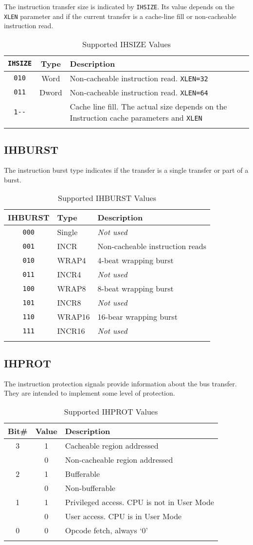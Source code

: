 The instruction transfer size is indicated by \texttt{IHSIZE}. Its value depends
on the \texttt{XLEN} parameter and if the current transfer is a cache-line fill
or non-cacheable instruction read.

\begin{longtable}[]{@{}ccp{7cm}@{}}
\toprule
\texttt{IHSIZE} & Type & Description\tabularnewline
\midrule
\endhead
\texttt{010}   & Word  & Non-cacheable instruction read. \texttt{XLEN=32}\tabularnewline
\texttt{011}   & Dword & Non-cacheable instruction read. \texttt{XLEN=64}\tabularnewline
\texttt{1-\/-} &       & Cache line fill. The actual size depends on the Instruction cache parameters and \texttt{XLEN}\tabularnewline
\bottomrule
\caption{Supported IHSIZE Values}
\label{tab:isize-values}
\end{longtable}

\subsection{IHBURST}\label{ihburst}

The instruction burst type indicates if the transfer is a single
transfer or part of a burst.

\begin{longtable}[]{@{}cll@{}}
\toprule
IHBURST & Type & Description\tabularnewline
\midrule
\endhead
\texttt{000} & Single & \emph{Not used}\tabularnewline
\texttt{001} & INCR   & Non-cacheable instruction reads\tabularnewline
\texttt{010} & WRAP4  & 4-beat wrapping burst\tabularnewline
\texttt{011} & INCR4  & \emph{Not used}\tabularnewline
\texttt{100} & WRAP8  & 8-beat wrapping burst\tabularnewline
\texttt{101} & INCR8  & \emph{Not used}\tabularnewline
\texttt{110} & WRAP16 & 16-bear wrapping burst\tabularnewline
\texttt{111} & INCR16 & \emph{Not used}\tabularnewline
\bottomrule
\caption{Supported IHBURST Values}
\label{tab:ihburst-values}
\end{longtable}

\subsection{IHPROT}\label{ihprot}

The instruction protection signals provide information about the bus
transfer. They are intended to implement some level of protection.

\begin{longtable}[]{@{}ccl@{}}
\toprule
Bit\# & Value & Description\tabularnewline
\midrule
\endhead
3 & 1 & Cacheable region addressed\tabularnewline
  & 0 & Non-cacheable region addressed\tabularnewline
2 & 1 & Bufferable\tabularnewline
  & 0 & Non-bufferable\tabularnewline
1 & 1 & Privileged access. CPU is not in User Mode\tabularnewline
  & 0 & User access. CPU is in User Mode\tabularnewline
0 & 0 & Opcode fetch, always `0'\tabularnewline
\bottomrule
\caption{Supported IHPROT Values}
\label{tab:ihprot-values}
\end{longtable}


